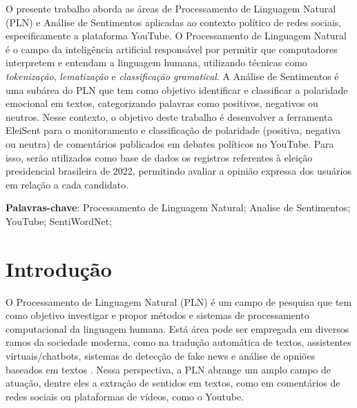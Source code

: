 \documentclass[
	12pt,				%
	openright,			%
	oneside,			%
	a4paper,			%
	english,			%
	brazil				%
	]{abntex2}
\begin{document}
    
\pagebreak





\setlength{\absparsep}{18pt} %
\begin{resumo} 
O presente trabalho aborda as áreas de Processamento de Linguagem Natural (PLN) e Análise de Sentimentos aplicadas ao contexto político de redes sociais, especificamente a plataforma YouTube. O Processamento de Linguagem Natural é o campo da inteligência artificial responsável por permitir que computadores interpretem e entendam a linguagem humana, utilizando técnicas como \textit{tokenização}, \textit{lematização} e \textit{classificação gramatical}. A Análise de Sentimentos é uma subárea do PLN que tem como objetivo identificar e classificar a polaridade emocional em textos, categorizando palavras como positivos, negativos ou neutros. Nesse contexto, o objetivo deste trabalho é desenvolver a ferramenta EleiSent para o monitoramento e classificação de polaridade (positiva, negativa ou neutra) de comentários publicados em debates políticos no YouTube. Para isso, serão utilizados como base de dados os registros referentes à eleição presidencial brasileira de 2022, permitindo avaliar a opinião expressa dos usuários em relação a cada candidato.


 \textbf{Palavras-chave}: Processamento de Linguagem Natural; Analise de Sentimentos; YouTube; SentiWordNet;
\end{resumo}

\cleardoublepage


\tableofcontents*
\cleardoublepage



\textual

\chapter{Introdução}
O Processamento de Linguagem Natural (PLN) é um campo de pesquisa que tem como objetivo investigar e propor métodos e sistemas de processamento computacional da linguagem humana. Está área pode ser empregada em diversos ramos da sociedade moderna, como na tradução automática de textos, assistentes virtuais/chatbots, sistemas de detecção de fake news e análise de opniões baseados em textos \cite{BPLN_livro_4ed_2026}. Nessa perspectiva, a PLN abrange um amplo campo de atuação, dentre eles a extração de sentidos em textos, como em comentários de redes sociais ou plataformas de vídeos, como o Youtube.
\end{document}
